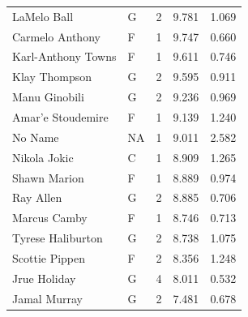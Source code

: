 \begin{table}[t]
\begin{tabular*}{\linewidth}{@{\extracolsep{\fill}}llcrr}
LaMelo Ball & G & 2 & 9.781 & 1.069 \\ 
Carmelo Anthony & F & 1 & 9.747 & 0.660 \\ 
Karl-Anthony Towns & F & 1 & 9.611 & 0.746 \\ 
Klay Thompson & G & 2 & 9.595 & 0.911 \\ 
Manu Ginobili & G & 2 & 9.236 & 0.969 \\ 
Amar'e Stoudemire & F & 1 & 9.139 & 1.240 \\ 
No Name & NA & 1 & 9.011 & 2.582 \\ 
Nikola Jokic & C & 1 & 8.909 & 1.265 \\ 
Shawn Marion & F & 1 & 8.889 & 0.974 \\ 
Ray Allen & G & 2 & 8.885 & 0.706 \\ 
Marcus Camby & F & 1 & 8.746 & 0.713 \\ 
Tyrese Haliburton & G & 2 & 8.738 & 1.075 \\ 
Scottie Pippen & F & 2 & 8.356 & 1.248 \\ 
Jrue Holiday & G & 4 & 8.011 & 0.532 \\ 
Jamal Murray & G & 2 & 7.481 & 0.678 \\ 
\bottomrule
\end{tabular*}
\end{table}

